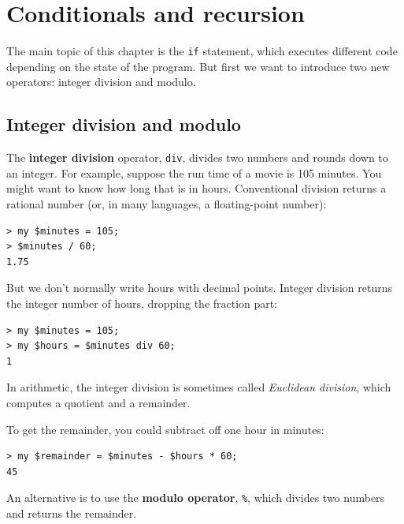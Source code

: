 \chapter{Conditionals and recursion}
\label{conditionals}

The main topic of this chapter is the {\tt if} statement, which
executes different code depending on the state of the program.
But first we want to introduce two new operators: integer 
division and modulo.


\section{Integer division and modulo}

The {\bf integer division} operator, \verb"div", divides
two numbers and rounds down to an integer.  For example, 
suppose the
run time of a movie is 105 minutes.  You might want to know how
long that is in hours.  Conventional division
returns a rational number (or, in many languages, a floating-point number):

\begin{verbatim}
> my $minutes = 105;
> $minutes / 60;
1.75
\end{verbatim}

But we don't normally write hours with decimal points.  Integer 
division returns the integer number of hours, dropping the
fraction part:

\begin{verbatim}
> my $minutes = 105;
> my $hours = $minutes div 60;
1
\end{verbatim}

In arithmetic, the integer division is sometimes called 
\emph{Euclidean division}, which computes a quotient and a 
remainder.

To get the remainder, you could subtract off one hour in minutes:

\begin{verbatim}
> my $remainder = $minutes - $hours * 60;
45
\end{verbatim}



An alternative is to use the {\bf modulo operator}, \verb"%", which
divides two numbers and returns the remainder.


